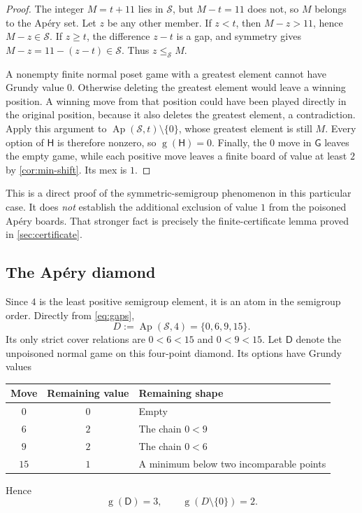\documentclass[11pt,letterpaper]{article}
\numberwithin{equation}{section}
\theoremstyle{definition}
\newcommand{\Sg}{\mathcal S}
\newcommand{\Gr}{\operatorname{g}}
\newcommand{\Ap}{\operatorname{Ap}}
\renewcommand{\Game}{\mathsf G}
\newcommand{\Poison}{\mathsf H}
\newcommand{\DiamondGame}{\mathsf D}
\begin{document}
\begin{proof}
The integer $M=t+11$ lies in $\Sg$, but $M-t=11$ does not, so $M$ belongs
to the Ap\'ery set. Let $z$ be any other member. If $z<t$, then
$M-z>11$, hence $M-z\in\Sg$. If $z\geq t$, the difference $z-t$ is a gap,
and symmetry gives $M-z=11-(z-t)\in\Sg$. Thus $z\leq_{\Sg}M$.

A nonempty finite normal poset game with a greatest element cannot have
Grundy value $0$. Otherwise deleting the greatest element would leave a
winning position. A winning move from that position could have been played
directly in the original position, because it also deletes the greatest
element, a contradiction. Apply this argument to
$\Ap(\Sg,t)\setminus\{0\}$, whose greatest element is still $M$.
Every option of $\Poison$ is therefore nonzero, so $\Gr(\Poison)=0$.
Finally, the $0$ move in $\Game$ leaves the empty game, while each positive
move leaves a finite board of value at least $2$ by
\cref{cor:min-shift}. Its mex is $1$.
\end{proof}

This is a direct proof of the symmetric-semigroup phenomenon in this
particular case. It does \emph{not} establish the additional exclusion of
value $1$ from the poisoned Ap\'ery boards. That stronger fact is precisely
the finite-certificate lemma proved in \cref{sec:certificate}.

\subsection{The Ap\'ery diamond}

Since $4$ is the least positive semigroup element, it is an atom in the
semigroup order. Directly from \cref{eq:gaps},
\begin{equation}\label{eq:diamond}
 D:=\Ap(\Sg,4)=\{0,6,9,15\}.
\end{equation}
Its only strict cover relations are
$0<6<15$ and $0<9<15$. Let $\DiamondGame$ denote the unpoisoned normal game
on this four-point diamond. Its options have Grundy values
\begin{center}
\begin{tabular}{ccl}
\toprule
Move & Remaining value & Remaining shape\\
\midrule
$0$ & $0$ & Empty\\
$6$ & $2$ & The chain $0<9$\\
$9$ & $2$ & The chain $0<6$\\
$15$ & $1$ & A minimum below two incomparable points\\
\bottomrule
\end{tabular}
\end{center}
Hence
\begin{equation}\label{eq:diamond-value}
 \Gr(\DiamondGame)=3,
 \qquad \Gr(D\setminus\{0\})=2.
\end{equation}
\end{document}
